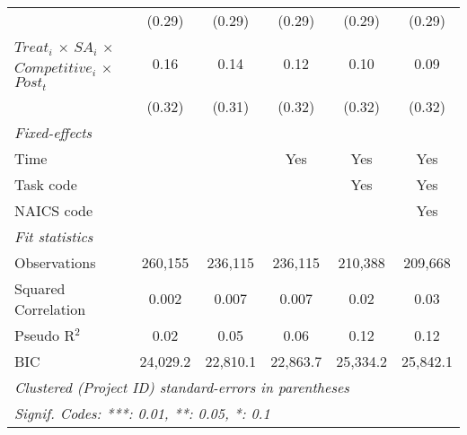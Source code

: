 \documentclass[
]{article}
\begin{document}
\begin{table}[htbp]
\begin{tabular}{lccccc}
                                                                              & (0.29)        & (0.29)        & (0.29)       & (0.29)      & (0.29)\\
      $Treat_i$ $\times$ $SA_i$ $\times$ $Competitive_i$ $\times$ $Post_t$ & 0.16          & 0.14          & 0.12         & 0.10        & 0.09\\
                                                                              & (0.32)        & (0.31)        & (0.32)       & (0.32)      & (0.32)\\
      \midrule \emph{Fixed-effects} &   &   &   &   &  \\
      Time                                                                    &               &               & Yes          & Yes         & Yes\\
      Task code                                                               &               &               &              & Yes         & Yes\\
      NAICS code                                                              &               &               &              &             & Yes\\
      \midrule \emph{Fit statistics} &   &   &   &   &  \\
      Observations                                                            & 260,155       & 236,115       & 236,115      & 210,388     & 209,668\\
      Squared Correlation                                                     & 0.002         & 0.007         & 0.007        & 0.02        & 0.03\\
      Pseudo R$^2$                                                            & 0.02          & 0.05          & 0.06         & 0.12        & 0.12\\
      BIC                                                                     & 24,029.2      & 22,810.1      & 22,863.7     & 25,334.2    & 25,842.1\\
      \midrule\midrule\multicolumn{6}{l}{\emph{Clustered (Project ID) standard-errors in parentheses}}\\
      \multicolumn{6}{l}{\emph{Signif. Codes: ***: 0.01, **: 0.05, *: 0.1}}\\
   \end{tabular}
\end{table}
\end{document}
